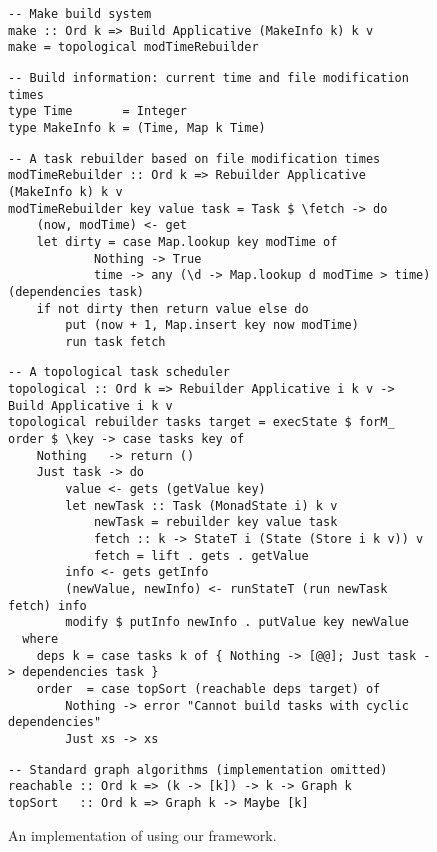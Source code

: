 \begin{figure}
\begin{verbatim}
-- Make build system
make :: Ord k => Build Applicative (MakeInfo k) k v
make = topological modTimeRebuilder
\end{verbatim}
\vspace{0mm}
\begin{verbatim}
-- Build information: current time and file modification times
type Time       = Integer
type MakeInfo k = (Time, Map k Time)
\end{verbatim}
\vspace{0mm}
\begin{verbatim}
-- A task rebuilder based on file modification times
modTimeRebuilder :: Ord k => Rebuilder Applicative (MakeInfo k) k v
modTimeRebuilder key value task = Task $ \fetch -> do
    (now, modTime) <- get
    let dirty = case Map.lookup key modTime of
            Nothing -> True
            time -> any (\d -> Map.lookup d modTime > time) (dependencies task)
    if not dirty then return value else do
        put (now + 1, Map.insert key now modTime)
        run task fetch
\end{verbatim}
\vspace{0mm}
\begin{verbatim}
-- A topological task scheduler
topological :: Ord k => Rebuilder Applicative i k v -> Build Applicative i k v
topological rebuilder tasks target = execState $ forM_ order $ \key -> case tasks key of
    Nothing   -> return ()
    Just task -> do
        value <- gets (getValue key)
        let newTask :: Task (MonadState i) k v
            newTask = rebuilder key value task
            fetch :: k -> StateT i (State (Store i k v)) v
            fetch = lift . gets . getValue
        info <- gets getInfo
        (newValue, newInfo) <- runStateT (run newTask fetch) info
        modify $ putInfo newInfo . putValue key newValue
  where
    deps k = case tasks k of { Nothing -> [@@]; Just task -> dependencies task }
    order  = case topSort (reachable deps target) of
        Nothing -> error "Cannot build tasks with cyclic dependencies"
        Just xs -> xs
\end{verbatim}
\vspace{0mm}
\begin{verbatim}
-- Standard graph algorithms (implementation omitted)
reachable :: Ord k => (k -> [k]) -> k -> Graph k
topSort   :: Ord k => Graph k -> Maybe [k]
\end{verbatim}
\vspace{-2mm}
\caption{An implementation of \Make using our framework.}\label{fig-make-implementation}
\vspace{-4mm}
\end{figure}

